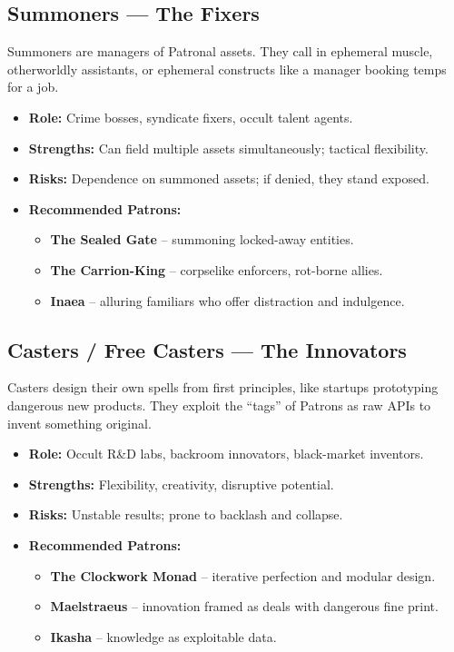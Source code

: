 \documentclass[11pt]{article}
\begin{document}
\subsection*{Summoners --- The Fixers}
Summoners are managers of Patronal assets. They call in ephemeral muscle, otherworldly assistants, or ephemeral constructs like a manager booking temps for a job.
\begin{itemize}
  \item \textbf{Role:} Crime bosses, syndicate fixers, occult talent agents.
  \item \textbf{Strengths:} Can field multiple assets simultaneously; tactical flexibility.
  \item \textbf{Risks:} Dependence on summoned assets; if denied, they stand exposed.
  \item \textbf{Recommended Patrons:}
    \begin{itemize}
      \item \textbf{The Sealed Gate} -- summoning locked-away entities.
      \item \textbf{The Carrion-King} -- corpselike enforcers, rot-borne allies.
      \item \textbf{Inaea} -- alluring familiars who offer distraction and indulgence.
    \end{itemize}
\end{itemize}

\subsection*{Casters / Free Casters --- The Innovators}
Casters design their own spells from first principles, like startups prototyping dangerous new products. They exploit the ``tags'' of Patrons as raw APIs to invent something original.
\begin{itemize}
  \item \textbf{Role:} Occult R\&D labs, backroom innovators, black-market inventors.
  \item \textbf{Strengths:} Flexibility, creativity, disruptive potential.
  \item \textbf{Risks:} Unstable results; prone to backlash and collapse.
  \item \textbf{Recommended Patrons:}
    \begin{itemize}
      \item \textbf{The Clockwork Monad} -- iterative perfection and modular design.
      \item \textbf{Maelstraeus} -- innovation framed as deals with dangerous fine print.
      \item \textbf{Ikasha} -- knowledge as exploitable data.
    \end{itemize}
\end{itemize}
\end{document}
